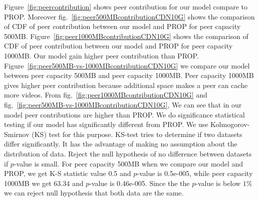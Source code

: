 \documentclass[conference]{IEEEtran}
\begin{document}
Figure~\ref{fig:peercontribution} shows peer contribution for our model compare to PROP. 
Moreover fig.~\ref{fig:peer500MBcontributionCDN10G} shows the comparison of CDF of peer contribution between our model and PROP for peer capacity 500MB. 
Figure~\ref{fig:peer1000MBcontributionCDN10G} shows the comparison of CDF of peer contribution between our model and PROP for peer capacity 1000MB.
Our model gain higher peer contribution than PROP. 
Figure~\ref{fig:peer500MB-vs-1000MBcontributionCDN10G} we compare our model between peer capacity 500MB and peer capacity 1000MB.
Peer capacity 1000MB gives higher peer contribution because additional space makes a peer can cache more videos.
From fig.~\ref{fig:peer1000MBcontributionCDN10G} and fig.~\ref{fig:peer500MB-vs-1000MBcontributionCDN10G}, We can see that in our model peer contributions are higher than PROP.
We do significance statistical testing if our model has significantly different from PROP.
We use Kolmogorov-Smirnov (KS) test for this purpose.  
KS-test tries to determine if two datasets differ significantly.  
It has the advantage of making no assumption about the distribution of data. 
Reject the null hypothesis of no difference between datasets if $p$-value is small.
For peer capacity 500MB when we compare our model and PROP, we get K-S statistic value 0.5 and $p$-value is 0.5e-005, while peer capacity 1000MB we get 63.34 and $p$-value is 0.46e-005.
Since the the $p$-value is below $1\%$ we can reject null hypothesis that both data are the same.
\end{document}
